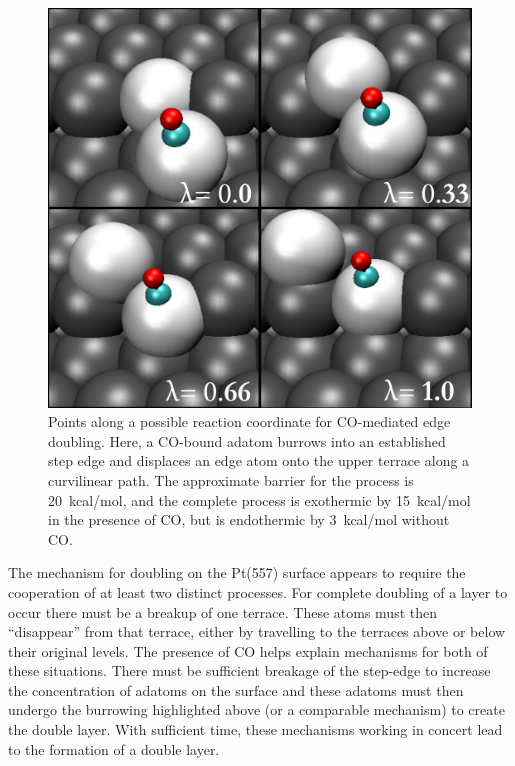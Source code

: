\begin{figure}[p!]
\includegraphics[width=\linewidth]{../figures/chap2/rxn.pdf}
\caption{Points along a possible reaction coordinate for CO-mediated
  edge doubling. Here, a CO-bound adatom burrows into an established
  step edge and displaces an edge atom onto the upper terrace along a
  curvilinear path.  The approximate barrier for the process is
  20~kcal/mol, and the complete process is exothermic by 15~kcal/mol
  in the presence of CO, but is endothermic by 3~kcal/mol without CO.}
\label{fig:lambda}
\end{figure}

The mechanism for doubling on the Pt(557) surface appears to require
the cooperation of at least two distinct processes. For complete
doubling of a layer to occur there must be a breakup of one
terrace. These atoms must then ``disappear'' from that terrace, either
by travelling to the terraces above or below their original levels.
The presence of CO helps explain mechanisms for both of these
situations. There must be sufficient breakage of the step-edge to
increase the concentration of adatoms on the surface and these adatoms
must then undergo the burrowing highlighted above (or a comparable
mechanism) to create the double layer.  With sufficient time, these
mechanisms working in concert lead to the formation of a double layer.

